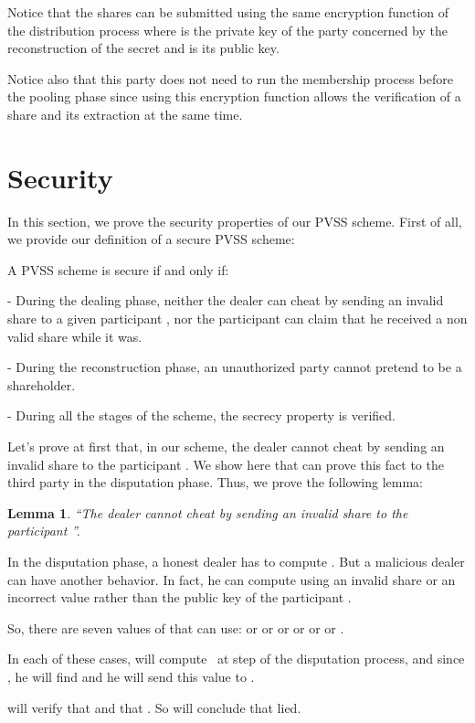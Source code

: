 \documentclass[submission,copyright,creativecommons]{eptcs}
\newtheorem{lemma}[theorem]{Lemma}
\newenvironment{proof}[1][Proof]{\begin{trivlist}
\item[\hskip \labelsep {\bfseries #1}]}{\end{trivlist}}
\newenvironment{definition}[1][Definition]{\begin{trivlist}
\item[\hskip \labelsep {\bfseries #1}]}{\end{trivlist}}
\begin{document}
Notice that the shares can be submitted using the same encryption function
of the distribution process  where 
is the private key of the party concerned by the reconstruction of the
secret and  is its public key.

Notice also that this party does not need to run the membership process
before the pooling phase since using this encryption function allows the
verification of a share and its extraction at the same time.

\section{Security}

In this section, we prove the security properties of our PVSS scheme. First
of all, we provide our definition of a secure PVSS scheme:

\begin{definition}
A PVSS scheme is secure if and only if:

- During the dealing phase, neither the dealer  can cheat by sending an
invalid share to a given participant , nor the participant 
can claim that he received a non valid share while it was.

- During the reconstruction phase, an unauthorized party cannot pretend to
be a shareholder.

- During all the stages of the scheme, the secrecy property is verified.
\end{definition}

Let's prove at first that, in our scheme, the dealer  cannot cheat by
sending an invalid share to the participant . We show here that  can prove this fact to the third party  in the disputation phase.
Thus, we prove the following lemma:

\begin{lemma}
\textquotedblleft The dealer  cannot cheat by sending an invalid share to
the participant \textquotedblright .
\end{lemma}

\begin{proof}
In the disputation phase, a honest dealer has to compute . But a malicious dealer can have another
behavior. In fact, he can compute  using an invalid share  or an incorrect value  rather than the
public key  of the participant .

So, there are seven values of  that  can use:  or  or  or  or  or  or .

In each of these cases,  will compute  \  at step  of the disputation process, and since , he will find  
 and he will send this value to .

 will verify that  and that . So  will
conclude that  lied.
\end{proof}
\end{document}
